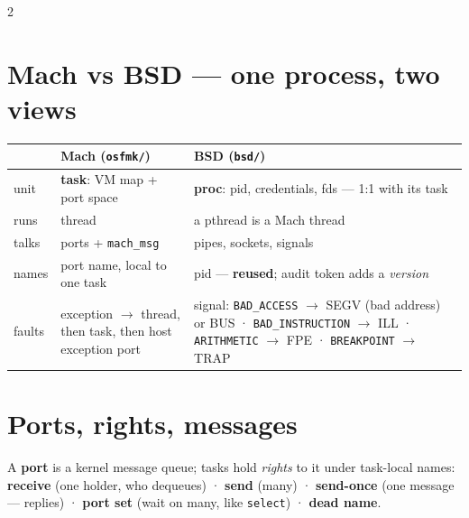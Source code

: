 \documentclass[8pt]{extarticle}
\newcommand\ct[1]{\texttt{#1}}
\begin{document}
\begin{multicols}{2}
\raggedright
\footnotesize{}

\section{Mach vs BSD — one process, two views}
{\scriptsize\setlength\tabcolsep{2.5pt}
\begin{tabular}{@{}>{\raggedright\arraybackslash}p{9mm}>{\raggedright\arraybackslash}p{30mm}>{\raggedright\arraybackslash}p{37mm}@{}}
\toprule
 & \textbf{Mach} (\ct{osfmk/}) & \textbf{BSD} (\ct{bsd/})\\ \midrule
unit & \textbf{task}: VM map + port space & \textbf{proc}: pid, credentials, fds — 1:1 with its task\\
runs & thread & a pthread is a Mach thread\\
talks & ports + \ct{mach\_msg} & pipes, sockets, signals\\
names & port name, local to one task & pid — \textbf{reused}; audit token adds a \emph{version}\\
faults & exception $\to$ thread, then task, then host exception port & signal: \ct{BAD\_ACCESS} $\to$ SEGV (bad address) or BUS · \ct{BAD\_INSTRUCTION} $\to$ ILL · \ct{ARITHMETIC} $\to$ FPE · \ct{BREAKPOINT} $\to$ TRAP\\
\bottomrule
\end{tabular}}

\section{Ports, rights, messages}
A \textbf{port} is a kernel message queue; tasks hold \emph{rights} to it under task-local names:
\textbf{receive} (one holder, who dequeues) · \textbf{send} (many) · \textbf{send-once} (one
message — replies) · \textbf{port set} (wait on many, like \ct{select}) · \textbf{dead name}.


\end{multicols}
\end{document}
